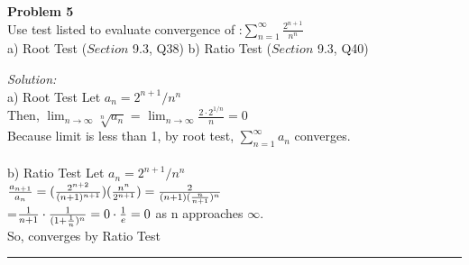 \documentclass[a4paper, 11pt]{article}
\newenvironment{problem}[2][Problem]
    { \begin{mdframed}[backgroundcolor=gray!20] \textbf{#1 #2} \\}
    {  \end{mdframed}}
\newenvironment{solution}
    {\textit{Solution:}}
    {}
\begin{document}
\begin{problem}{5}
Use test listed to evaluate convergence of :$\sum\limits_{n=1}^\infty \frac{2^{n+1}}{n^n}$
\\a) Root Test  ($Section$ 9.3, Q38)          b) Ratio Test ($Section$ 9.3, Q40)
\\

\end{problem}
\begin{solution}
\\a) Root Test
Let $a_n = 2^{n+1} / n^n$
\\Then, $\lim_{n\to\infty}  \sqrt[n]{a_n}$ = $\lim_{n\to\infty} \frac{2 \cdot 2^{1/n}}{n} = 0$
\\Because limit is less than 1, by root test, $\sum\limits_{n=1}^\infty a_n$ converges.
\\
\\b) Ratio Test
Let $a_n = 2^{n+1} / n^n$
\\$\frac{a_{n+1}}{a_n} = (\frac{2^{n+2}}{(n+1)^{n+1}})(\frac{n^{n}}{2^{n+1}})
\\=\frac{2}{(n+1)(\frac{n}{n+1})^n}$
\\=$\frac{1}{n+1} \cdot \frac{1}{(1+\frac{1}{n})^n}
\\= 0 \cdot \frac{1}{e}  = 0$ as n approaches $\infty$.
\\So, converges by Ratio Test
\\
\end{solution} 
\noindent\rule{7in}{2.8pt}
\end{document}
